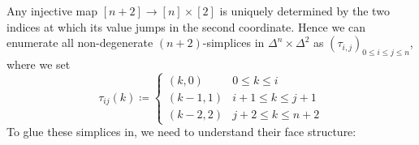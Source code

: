         Any injective map $[n + 2] \to [n] \times [2]$ is uniquely determined by the two indices at which its value jumps in the second coordinate. Hence we can enumerate all non-degenerate $(n + 2)$-simplices in $\Delta^n \times \Delta^2$ as $(\tau_{i,j})_{0 \leq i \leq j \leq n}$, where we set
        \begin{equation*}
            \tau_{i j}(k) \coloneq
            \begin{cases}
                (k, 0) & 0 \leq k \leq i \\
                (k - 1, 1) & i + 1 \leq k \leq j + 1 \\
                (k - 2, 2) & j + 2 \leq k \leq n + 2
            \end{cases}
        \end{equation*}
        To glue these simplices in, we need to understand their face structure:
